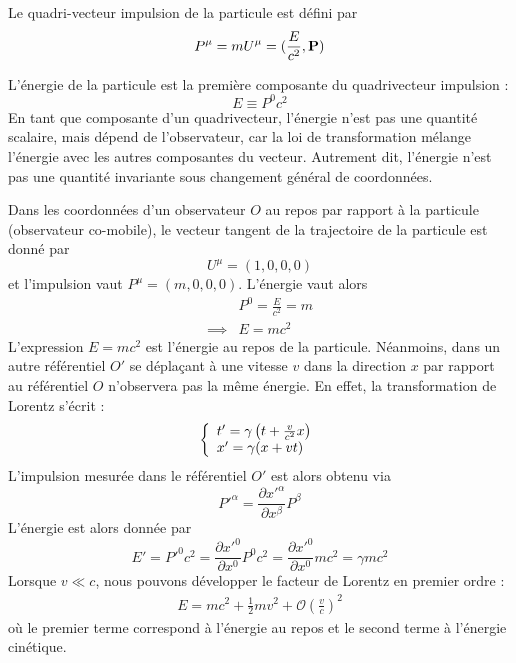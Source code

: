\begin{theoremframe}
    \begin{defi}
        Le quadri-vecteur impulsion de la particule est défini par
        \begin{equation}
            P^{\mu} = mU^{\mu} = (\frac{E}{c^2}, \bm{\mathrm{P}})
        \end{equation}
        \end{defi}
\end{theoremframe}
L’énergie de la particule est la première composante du quadrivecteur impulsion :
\begin{equation}
    E \equiv P^{0} c^2
\end{equation}
En tant que composante d'un quadrivecteur, l'énergie n'est pas une quantité scalaire, mais dépend de l'observateur, car la loi de transformation mélange l'énergie avec les autres composantes du vecteur. Autrement dit, l'énergie n'est pas une quantité invariante sous changement général de coordonnées. 
\begin{exmp}
    Dans les coordonnées d'un observateur $O$ au repos par rapport à la particule (observateur co-mobile), le vecteur tangent de la trajectoire de la particule est donné par
    \begin{equation}
        U^{\mu} = (1,0,0,0)
    \end{equation}
    et l'impulsion vaut $P^{\mu} = (m,0,0,0)$. L'énergie vaut alors
    \begin{align}
        &P^0 = \frac{E}{c^2}=m\\
        \implies &E = mc^2
    \end{align}
    L'expression $E = mc^2$ est l'énergie au repos de la particule. Néanmoins, dans un autre référentiel $O'$ se déplaçant à une vitesse $v$ dans la direction $x$ par rapport au référentiel $O$ n'observera pas la même énergie. En effet, la transformation de Lorentz s'écrit :
    \begin{equation}
        \left\{
        \begin{array}{l}
            t' = \gamma \left( t + \frac{v}{c^2}x\right)\\
            x' = \gamma (x + vt)
        \end{array}
        \right.
    \end{equation}
    L'impulsion mesurée dans le référentiel $O'$ est alors obtenu via 
    \begin{equation}
        P'^{\alpha} = \frac{\partial x'^{\alpha}}{\partial x^{\beta}} P^{\beta}
    \end{equation}
    L'énergie est alors donnée par
    \begin{equation}
        E' = P'^{0}c^2 = \frac{\partial x'^{0}}{\partial x^{0}} P^{0}c^2 = \frac{\partial x'^{0}}{\partial x^{0}}m c^2= \gamma m c^2
    \end{equation}
    Lorsque $v\ll c$, nous pouvons développer le facteur de Lorentz en premier ordre :
    \begin{align}    
        E = mc^2 + \frac{1}{2}mv^2 + \mathcal{O}\left(\frac{v}{c}\right)^2
    \end{align}
    où le premier terme correspond à l'énergie au repos et le second terme à l'énergie cinétique. 
\end{exmp}
